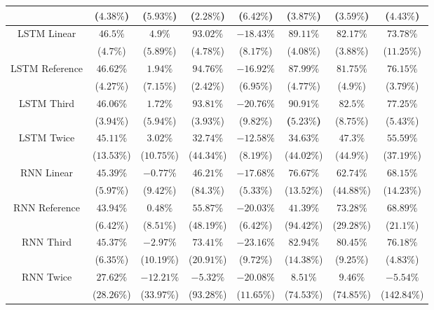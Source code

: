 \begin{table}[!ht]
{\begin{tabular}{|c|c|c|c|c|c|c|c|}
			 & ($4.38\%$) & ($5.93\%$) & ($2.28\%$) & ($6.42\%$) & ($3.87\%$) & ($3.59\%$) & ($4.43\%$) \\ \hline
			\multirow{2}{*}{LSTM Linear} & $46.5\%$ & $4.9\%$ & $93.02\%$ & $-18.43\%$ & $89.11\%$ & $82.17\%$ & $73.78\%$ \\
			 & ($4.7\%$) & ($5.89\%$) & ($4.78\%$) & ($8.17\%$) & ($4.08\%$) & ($3.88\%$) & ($11.25\%$) \\ \hline
			\multirow{2}{*}{LSTM Reference} & $46.62\%$ & $1.94\%$ & $94.76\%$ & $-16.92\%$ & $87.99\%$ & $81.75\%$ & $76.15\%$ \\
			 & ($4.27\%$) & ($7.15\%$) & ($2.42\%$) & ($6.95\%$) & ($4.77\%$) & ($4.9\%$) & ($3.79\%$) \\ \hline
			\multirow{2}{*}{LSTM Third} & $46.06\%$ & $1.72\%$ & $93.81\%$ & $-20.76\%$ & $\mathbf{90.91\%}$ & $82.5\%$ & $77.25\%$ \\
			 & ($3.94\%$) & ($5.94\%$) & ($3.93\%$) & ($9.82\%$) & \textbf{(}$\mathbf{5.23\%}$\textbf{)} & ($8.75\%$) & ($5.43\%$) \\ \hline
			\multirow{2}{*}{LSTM Twice} & $45.11\%$ & $3.02\%$ & $32.74\%$ & $-12.58\%$ & $34.63\%$ & $47.3\%$ & $55.59\%$ \\
			 & ($13.53\%$) & ($10.75\%$) & ($44.34\%$) & ($8.19\%$) & ($44.02\%$) & ($44.9\%$) & ($37.19\%$) \\ \hline
			\multirow{2}{*}{RNN Linear} & $45.39\%$ & $-0.77\%$ & $46.21\%$ & $-17.68\%$ & $76.67\%$ & $62.74\%$ & $68.15\%$ \\
			 & ($5.97\%$) & ($9.42\%$) & ($84.3\%$) & ($5.33\%$) & ($13.52\%$) & ($44.88\%$) & ($14.23\%$) \\ \hline
			\multirow{2}{*}{RNN Reference} & $43.94\%$ & $0.48\%$ & $55.87\%$ & $-20.03\%$ & $41.39\%$ & $73.28\%$ & $68.89\%$ \\
			 & ($6.42\%$) & ($8.51\%$) & ($48.19\%$) & ($6.42\%$) & ($94.42\%$) & ($29.28\%$) & ($21.1\%$) \\ \hline
			\multirow{2}{*}{RNN Third} & $45.37\%$ & $-2.97\%$ & $73.41\%$ & $-23.16\%$ & $82.94\%$ & $80.45\%$ & $76.18\%$ \\
			 & ($6.35\%$) & ($10.19\%$) & ($20.91\%$) & ($9.72\%$) & ($14.38\%$) & ($9.25\%$) & ($4.83\%$) \\ \hline
			\multirow{2}{*}{RNN Twice} & $27.62\%$ & $-12.21\%$ & $-5.32\%$ & $-20.08\%$ & $8.51\%$ & $9.46\%$ & $-5.54\%$ \\
			 & ($28.26\%$) & ($33.97\%$) & ($93.28\%$) & ($11.65\%$) & ($74.53\%$) & ($74.85\%$) & ($142.84\%$) \\ \hline

\end{tabular}}
\end{table}
